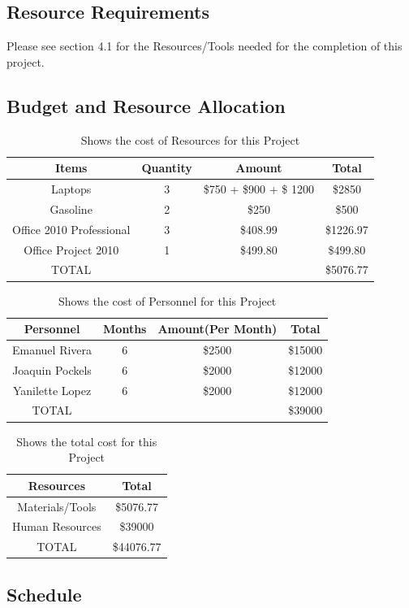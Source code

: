 \documentclass[12pt]{article}
\begin{document}
\subsection{Resource Requirements}
Please see section 4.1 for the Resources/Tools needed for the completion of this project.

\subsection{Budget and Resource Allocation}
\begin{table}[H]\centering
\begin{tabular}{|c|c|c|c|}
  \hline
  Items & Quantity & Amount & Total\\
   \hline
   Laptops & 3 & \$750 + \$900 + \$ 1200  & \$2850\\
   \hline
   Gasoline & 2 & \$250 & \$500\\
   \hline
   Office 2010 Professional & 3 & \$408.99 & \$1226.97 \\
   \hline
    Office Project 2010 & 1 & \$499.80 & \$499.80 \\
   \hline
   TOTAL & & &\$5076.77\\
   \hline
\end{tabular}
\caption{Shows the cost of Resources for this Project}
\label{resources}
\end{table}

\begin{table}[H]\centering
\begin{tabular}{|c|c|c|c|}
  \hline
  Personnel  & Months & Amount(Per Month) & Total\\
   \hline
   Emanuel Rivera & 6 & \$2500  & \$15000\\
   \hline
   Joaquin Pockels & 6 & \$2000 & \$12000\\
   \hline
   Yanilette Lopez & 6 & \$2000 & \$12000 \\
   \hline
    TOTAL & & &\$39000\\
    \hline
\end{tabular}
\caption{Shows the cost of Personnel for this Project}
\label{personnel}
\end{table}

\begin{table}[H]\centering
\begin{tabular}{|c|c|}
  \hline
  Resources  & Total\\
   \hline
   Materials/Tools & \$5076.77\\
   \hline
   Human Resources & \$39000\\
   \hline
    TOTAL & \$44076.77\\
   \hline
\end{tabular}
\caption{Shows the total cost for this Project}
\label{total}
\end{table}
\subsection{Schedule}
\end{document}
